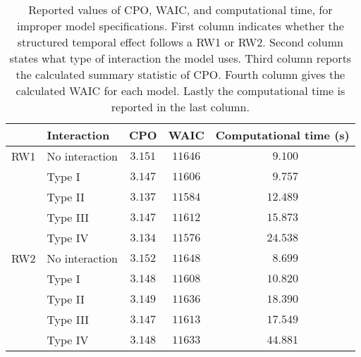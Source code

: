 \begin{table}

\caption{\label{tab:improper-results}Reported values of CPO, WAIC, and computational time,
           for improper model specifications.
          First column indicates whether the structured temporal effect follows a RW1 or RW2.
          Second column states what type of interaction the model uses.
          Third column reports the calculated summary statistic of CPO.
          Fourth column gives the calculated WAIC for each model.
          Lastly the computational time is reported in the last column.}
\centering
\begin{tabular}{llccc}
\hline
 & Interaction & CPO & WAIC & \multicolumn{1}{c}{Computational time (s)} \\ 
\hline
\nopagebreak RW1 & No interaction  & $3.151$ & $11646$ & $\phantom{0}9.100$ \\
 & Type I  & $3.147$ & $11606$ & $\phantom{0}9.757$ \\
 & Type II  & $3.137$ & $11584$ & $12.489$ \\
 & Type III  & $3.147$ & $11612$ & $15.873$ \\
 & Type IV  & $3.134$ & $11576$ & $24.538$ \\
\nopagebreak RW2 & No interaction  & $3.152$ & $11648$ & $\phantom{0}8.699$ \\
 & Type I  & $3.148$ & $11608$ & $10.820$ \\
 & Type II  & $3.149$ & $11636$ & $18.390$ \\
 & Type III  & $3.147$ & $11613$ & $17.549$ \\
 & Type IV  & $3.148$ & $11633$ & $44.881$ \\
\hline 
\end{tabular}


\end{table}